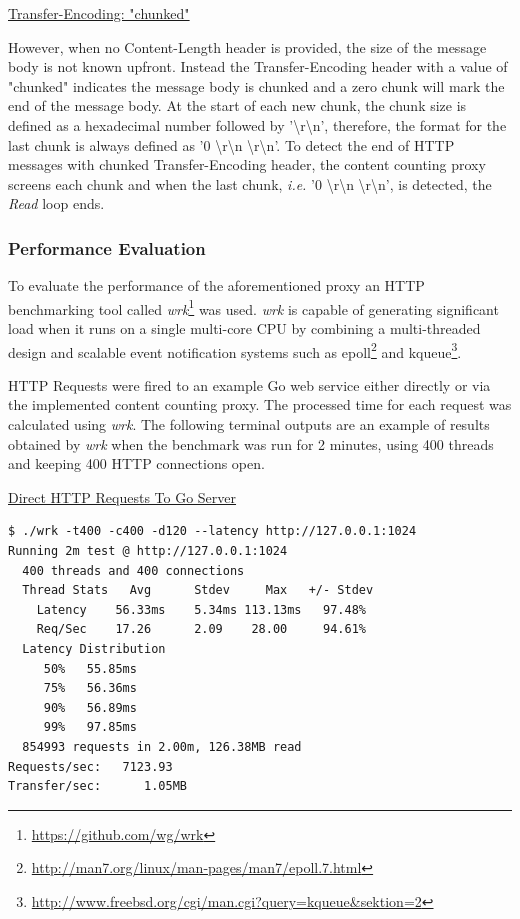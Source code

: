 \documentclass[a4paper,11pt,twoside]{report}
\begin{document}
\noindent
\underline{Transfer-Encoding: "chunked"}\medskip

\noindent
However, when no Content-Length header is provided, the size of the message body is not known upfront. Instead the Transfer-Encoding header with a value of "chunked" indicates the message body is chunked and a zero chunk will mark the end of the message body.  At the start of each new chunk, the chunk size is defined as a hexadecimal number followed by '\textbackslash r\textbackslash n', therefore, the format for the last chunk is always defined as '0 \textbackslash r\textbackslash n \textbackslash r\textbackslash n'. To detect the end of HTTP messages with chunked Transfer-Encoding header, the content counting proxy screens each chunk and when the last chunk, \textit{i.e.} '0 \textbackslash r\textbackslash n \textbackslash r\textbackslash n', is detected, the  \textit{Read} loop ends. 

\subsubsection*{Performance Evaluation} \label{wrk_1}
To evaluate the performance of the aforementioned proxy an HTTP benchmarking tool called \textit{wrk}\footnote{\label{wrk} \url{https://github.com/wg/wrk}} was used. \textit{wrk} is capable of generating significant load when it runs on a single multi-core CPU by combining a multi-threaded design and scalable event notification systems such as epoll\footnote{\label{epoll} \url{http://man7.org/linux/man-pages/man7/epoll.7.html}} and kqueue\footnote{\label{kqueue} \url{http://www.freebsd.org/cgi/man.cgi?query=kqueue&sektion=2}}.



HTTP Requests were fired to an example Go web service either directly or via the implemented content counting proxy. The processed time for each request was calculated using \textit{wrk}. The following terminal outputs are an example of results obtained by \textit{wrk} when the benchmark was run for 2 minutes, using 400 threads and keeping 400 HTTP connections open. \bigskip  

\noindent
\underline{Direct HTTP Requests To Go Server}
\begin{lstlisting}[language=terminal]
$ ./wrk -t400 -c400 -d120 --latency http://127.0.0.1:1024
Running 2m test @ http://127.0.0.1:1024
  400 threads and 400 connections
  Thread Stats   Avg      Stdev     Max   +/- Stdev
    Latency    56.33ms    5.34ms 113.13ms   97.48%
    Req/Sec    17.26      2.09    28.00     94.61%
  Latency Distribution
     50%   55.85ms
     75%   56.36ms
     90%   56.89ms
     99%   97.85ms
  854993 requests in 2.00m, 126.38MB read
Requests/sec:   7123.93
Transfer/sec:      1.05MB
\end{lstlisting}
\end{document}

